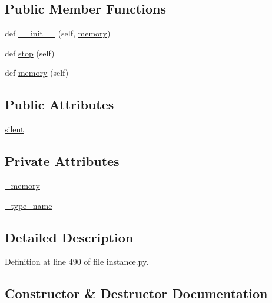 \subsection*{Public Member Functions}
\begin{DoxyCompactItemize}
\item 
def \hyperlink{classmemoryoracle_1_1instance_1_1MemoryWatcher_aa0c0186aa486476d02b6a0f65b696065}{\+\_\+\+\_\+init\+\_\+\+\_\+} (self, \hyperlink{classmemoryoracle_1_1instance_1_1MemoryWatcher_a81f9df7e7ef5e31d793ae395594e4bd9}{memory})
\item 
def \hyperlink{classmemoryoracle_1_1instance_1_1MemoryWatcher_a8bf3cc01cab2a9b1bf981f6f53546cb6}{stop} (self)
\item 
def \hyperlink{classmemoryoracle_1_1instance_1_1MemoryWatcher_a81f9df7e7ef5e31d793ae395594e4bd9}{memory} (self)
\end{DoxyCompactItemize}
\subsection*{Public Attributes}
\begin{DoxyCompactItemize}
\item 
\hyperlink{classmemoryoracle_1_1instance_1_1MemoryWatcher_af476be1c5fbde61b5d06eaabdcf74f9c}{silent}
\end{DoxyCompactItemize}
\subsection*{Private Attributes}
\begin{DoxyCompactItemize}
\item 
\hyperlink{classmemoryoracle_1_1instance_1_1MemoryWatcher_a7148f567970cd13c427af77c66351323}{\+\_\+memory}
\item 
\hyperlink{classmemoryoracle_1_1instance_1_1MemoryWatcher_aabd67feb966e0ed002597f497b8f1fb4}{\+\_\+type\+\_\+name}
\end{DoxyCompactItemize}


\subsection{Detailed Description}


Definition at line 490 of file instance.\+py.



\subsection{Constructor \& Destructor Documentation}
\hypertarget{classmemoryoracle_1_1instance_1_1MemoryWatcher_aa0c0186aa486476d02b6a0f65b696065}{}
